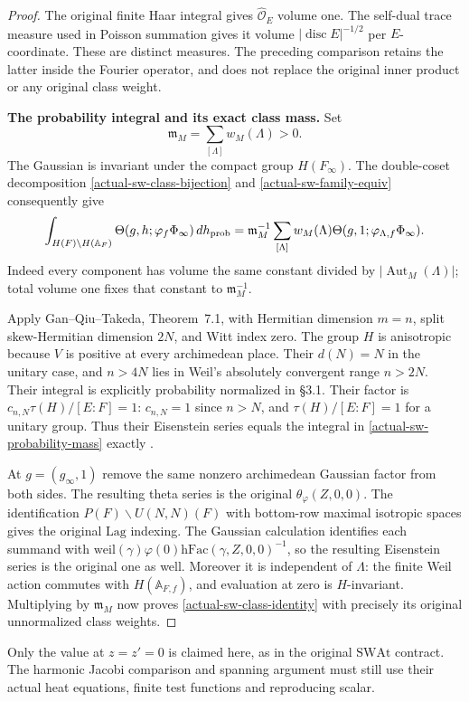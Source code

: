 \begin{proof}
The original finite Haar integral gives
$\widehat{\mathcal O}_E$ volume one. The self-dual trace measure
used in Poisson summation gives it volume
$|\operatorname{disc}E|^{-1/2}$ per $E$-coordinate. These are
distinct measures. The preceding comparison retains the latter
inside the Fourier operator, and does not replace the original
inner product or any original class weight.

\textbf{The probability integral and its exact class mass.}
Set
\[
       \mathfrak m_M=\sum_{[\Lambda]}w_M(\Lambda)>0.
\]
The Gaussian is invariant under the compact group $H(F_\infty)$.
The double-coset decomposition \eqref{actual-sw-class-bijection}
and \eqref{actual-sw-family-equiv} consequently give
\begin{equation}\label{actual-sw-probability-mass}
 \int_{H(F)\backslash H(\mathbb A_F)}
           \Theta(g,h;\varphi_f\Phi_\infty)\,dh_{\rm prob}
   =\mathfrak m_M^{-1}\sum_{[\Lambda]}w_M(\Lambda)
                    \Theta(g,1;\varphi_{\Lambda,f}\Phi_\infty).
\end{equation}
Indeed every component has volume the same constant divided by
$|\operatorname{Aut}_M(\Lambda)|$; total volume one fixes that
constant to $\mathfrak m_M^{-1}$.

Apply Gan--Qiu--Takeda, Theorem~7.1, with Hermitian dimension
$m=n$, split skew-Hermitian dimension $2N$, and Witt index zero.
The group $H$ is anisotropic because $V$ is positive at every
archimedean place. Their $d(N)=N$ in the unitary case, and
$n>4N$ lies in Weil's absolutely convergent range $n>2N$.
Their integral is explicitly probability normalized in
\S3.1. Their factor is
$c_{n,N}\tau(H)/[E:F]=1$: $c_{n,N}=1$ since $n>N$, and
$\tau(H)/[E:F]=1$ for a unitary group.
Thus their Eisenstein series equals the integral in
\eqref{actual-sw-probability-mass} exactly
\cite{actual-sw-gqt,actual-sw-source}.

At $g=(g_\infty,1)$ remove the same nonzero archimedean
Gaussian factor from both sides. The resulting theta series is
the original $\theta_\varphi(Z,0,0)$. The identification
$P(F)\backslash U(N,N)(F)$ with bottom-row maximal isotropic
spaces gives the original $\mathrm{Lag}$ indexing. The Gaussian
calculation identifies each summand with
$\mathrm{weil}(\gamma)\varphi(0)\mathrm{hFac}(\gamma,Z,0,0)^{-1}$,
so the resulting Eisenstein series is the original one as well.
Moreover it is independent of $\Lambda$: the finite Weil action
commutes with $H(\mathbb A_{F,f})$, and evaluation at zero is
$H$-invariant. Multiplying by $\mathfrak m_M$ now proves
\eqref{actual-sw-class-identity} with precisely its original
unnormalized class weights.
\end{proof}

Only the value at $z=z'=0$ is claimed here, as in the original
$\mathrm{SWAt}$ contract. The harmonic Jacobi comparison and
spanning argument must still use their actual heat equations,
finite test functions and reproducing scalar.
